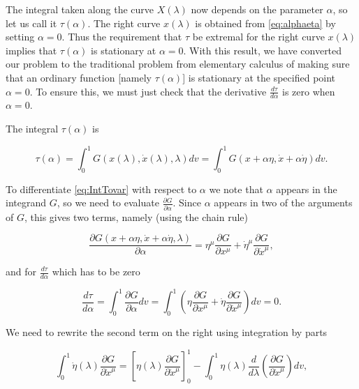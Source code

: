         The integral taken along the curve $X(\lambda)$ now depends on the parameter $\alpha$, so let us call it $\tau(\alpha)$. The right curve $x(\lambda)$ is obtained from \ref{eq:alphaeta} by setting $\alpha=0$. Thus the requirement that $\tau$ be extremal for the right curve $x(\lambda)$ implies that $\tau(\alpha)$ is stationary at $\alpha=0$. With this result, we have converted our problem to the traditional problem from elementary calculus of making sure that an ordinary function [namely $\tau(\alpha)$] is stationary at the specified point $\alpha=0$. To ensure this, we must just check that the derivative $\frac{d\tau}{d\alpha}$ is zero when $\alpha=0$.

        The integral $\tau(\alpha)$ is

        \begin{equation}\label{eq:IntTovar}
            \tau(\alpha) = \int_{0}^{1}G\left(x(\lambda),\Dot{x}(\lambda),\lambda \right)dv = \int_{0}^{1}G\left(x + \alpha\eta , \Dot{x} + \alpha\Dot{\eta}\right)dv.
        \end{equation}

        To differentiate \ref{eq:IntTovar} with respect to $\alpha$ we note that $\alpha$ appears in the integrand $G$, so we need to evaluate $\frac{\partial G}{\partial\alpha}$. Since $\alpha$ appears in two of the arguments of $G$, this gives two terms, namely (using the chain rule)

        \begin{equation}
            \frac{\partial G\left(x + \alpha\eta , \Dot{x} + \alpha \Dot{\eta},\lambda \right)}{\partial \alpha} = \eta^{\mu}\frac{\partial G}{\partial x^{\mu}} + \Dot{\eta}^{\mu}\frac{\partial G}{\partial \Dot{x}^{\mu}},
        \end{equation}

        and for $\frac{d\tau}{d\alpha}$ which has to be zero

        \begin{equation}\label{eq:dtaudalph}
            \frac{d\tau}{d\alpha} = \int_0^1\frac{\partial G}{\partial \alpha}dv = \int_0^1\left(\eta\frac{\partial G}{\partial x^{\mu}} + \Dot{\eta}\frac{\partial G}{\partial \Dot{x}^{\mu}} \right)dv=0.
        \end{equation}

        We need to rewrite the second term on the right using integration by parts

        \begin{equation}
            \int_0^1\Dot{\eta}(\lambda)\frac{\partial G}{\partial \Dot{x}^{\mu} } = \left[\eta(\lambda) \frac{\partial G}{\partial \Dot{x}^{\mu}} \right]_0^1 - \int_0^1\eta(\lambda)\frac{d}{d\lambda}\left(\frac{\partial G}{\partial \Dot{x}^{\mu}} \right)dv,
        \end{equation}

